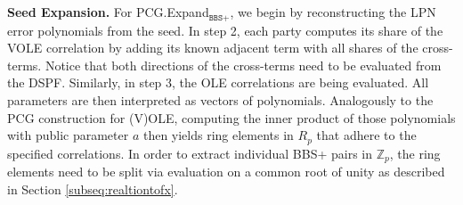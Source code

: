 \\\\
\textbf{Seed Expansion.} For PCG.Expand$_{\texttt{BBS+}}$, we begin by reconstructing the LPN error polynomials from the seed. In step 2, each party computes its share of the VOLE correlation by adding its known adjacent term with all shares of the cross-terms. Notice that both directions of the cross-terms need to be evaluated from the DSPF. Similarly, in step 3, the OLE correlations are being evaluated. All parameters are then interpreted as vectors of polynomials. Analogously to the PCG construction for (V)OLE, computing the inner product of those polynomials with public parameter $a$ then yields ring elements in $R_p$ that adhere to the specified correlations. In order to extract individual BBS+ pairs in $\mathbb{Z}_{p}$, the ring elements need to be split via evaluation on a common root of unity as described in Section \ref{subseq:realtiontofx}.


